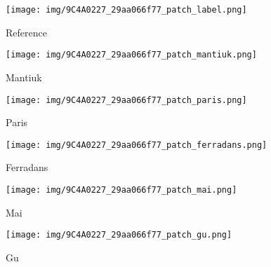 \documentclass[journal]{IEEEtran}
\begin{document}
\begin{figure*}[t]
        \centering
        \begin{subfigure}[b]{0.24\textwidth}  
            \centering 
            \texttt{[image: img/9C4A0227\_29aa066f77\_patch\_label.png]}
            \caption[]%
            {{\small Reference }}    
            \label{fig:mean and std of net24}
        \end{subfigure}
        \begin{subfigure}[b]{0.24\textwidth}  
            \centering 
            \texttt{[image: img/9C4A0227\_29aa066f77\_patch\_mantiuk.png]}
            \caption[]%
            {{\small Mantiuk \cite{mantiuk2008display} }}    
            \label{fig:mean and std of net24}
        \end{subfigure}
        \begin{subfigure}[b]{0.24\textwidth}   
            \centering 
            \texttt{[image: img/9C4A0227\_29aa066f77\_patch\_paris.png]}
            \caption[]%
            {{\small Paris \cite{paris2015local} }}    
            \label{fig:mean and std of net34}
        \end{subfigure}
        \begin{subfigure}[b]{0.24\textwidth}   
            \centering 
            \texttt{[image: img/9C4A0227\_29aa066f77\_patch\_ferradans.png]}
            \caption[]%
            {{\small Ferradans \cite{ferradans2011analysis}     }}    
            \label{fig:mean and std of net44}
        \end{subfigure}
        \label{fig:mean and std of nets}
        \centering
        \begin{subfigure}[b]{0.24\textwidth}
            \centering
            \texttt{[image: img/9C4A0227\_29aa066f77\_patch\_mai.png]}
            \caption[]%
            {{\small Mai \cite{mai2011optimizing} }}    
            \label{fig:mean and std of net14}
        \end{subfigure}
        \begin{subfigure}[b]{0.24\textwidth}
            \centering
            \texttt{[image: img/9C4A0227\_29aa066f77\_patch\_gu.png]}
            \caption[]%
            {{\small Gu \cite{gu2013local} }}    
            \label{fig:mean and std of net14}

\end{subfigure}
\end{figure*}
\end{document}
